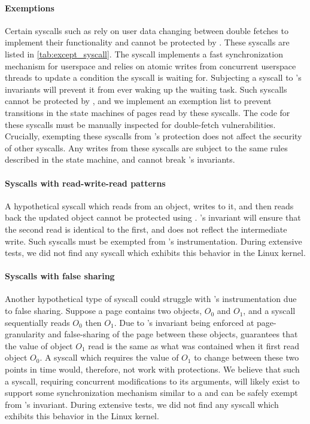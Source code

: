 \documentclass[letterpaper,twocolumn,10pt, anonymous]{article}
\begin{document}
\paragraph{Exemptions}
Certain syscalls such as  rely on user data changing between 
double fetches to implement their functionality and cannot be protected by
\tiktok.
These syscalls are listed in \autoref{tab:except_syscall}.
The  syscall implements a fast synchronization mechanism
for userspace and relies on atomic writes from concurrent userspace
threads to update a condition the syscall is waiting for. 
Subjecting a  syscall to \tiktok's invariants will prevent
it from ever waking up the waiting task.
Such syscalls cannot be protected by \tiktok, and we implement an 
exemption list to prevent transitions in the state machines of pages read 
by these syscalls.
The code for these syscalls must be manually inspected for double-fetch 
vulnerabilities.
Crucially, exempting these syscalls from \tiktok's protection does not 
affect the security of other syscalls. 
Any writes from these syscalls are subject to the same rules described
in the state machine, and cannot break \tiktok's invariants.


\paragraph{Syscalls with read-write-read patterns}
A hypothetical syscall which reads from an object, writes to it, and
then reads back the updated object cannot be protected using \tiktok.
\tiktok's invariant will ensure that the second read is identical to the first,
and does not reflect the intermediate write.
Such syscalls must be exempted from \tiktok's instrumentation.
During extensive tests, we did not find any syscall which exhibits this behavior in the Linux
kernel. 

\paragraph{Syscalls with false sharing}
Another hypothetical type of syscall could struggle with \tiktok's 
instrumentation due to false sharing.
Suppose a page contains two objects, $O_0$ and $O_1$, and a syscall  
sequentially reads $O_0$ then $O_1$.
Due to \tiktok's invariant being enforced at page-granularity and 
false-sharing of the page between these objects, \tiktok guarantees that
the value of object $O_1$ read is the same as what was contained when it 
first read object $O_0$. 
A syscall which requires the value of $O_1$ to change between these two 
points in time would, therefore, not work with \tiktok protections. 
We believe that such a syscall, requiring concurrent modifications to its 
arguments, will likely exist to support some synchronization mechanism 
similar to a  and can be safely exempt from \tiktok's invariant.
%
During extensive tests, we did not find any syscall which exhibits this behavior in the 
Linux kernel. 
\end{document}
